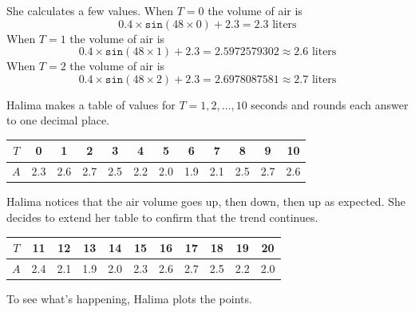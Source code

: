 She calculates a few values. When $T=0$ the volume of air is
$$0.4 \times \boxed{\texttt{sin}}(48 \times 0) + 2.3= 2.3 \text{ liters}$$
When $T=1$ the volume of air is
$$0.4 \times \boxed{\texttt{sin}}(48 \times 1) + 2.3= 2.5972579302 \approx 2.6 \text{ liters}$$
When $T=2$ the volume of air is
$$0.4 \times \boxed{\texttt{sin}}(48 \times 2) + 2.3= 2.6978087581 \approx 2.7 \text{ liters}$$

Halima makes a table of values for $T=1, 2, \ldots, 10$ seconds and rounds each answer to one decimal place.

\begin{center}
\begin{tabular}{c|c|c|c|c|c|c|c|c|c|c|c}
    $T$ & 0 & 1 & 2 & 3 & 4 & 5 & 6 & 7 & 8 & 9 & 10 \\ \hline
    $A$ & 2.3 & 2.6 & 2.7 & 2.5 & 2.2 & 2.0 & 1.9 & 2.1 & 2.5 & 2.7 & 2.6
\end{tabular}
\end{center}

Halima notices that the air volume goes up, then down, then up as expected.  She decides to extend her table to confirm that the trend continues.

\begin{center}
\begin{tabular}{c|c|c|c|c|c|c|c|c|c|c}
    $T$ & 11 & 12 & 13 & 14 & 15 & 16 & 17 & 18 & 19 & 20 \\ \hline
    $A$ & 2.4 & 2.1 & 1.9 & 2.0 & 2.3 & 2.6 & 2.7 & 2.5 & 2.2 & 2.0 
\end{tabular}
\end{center}

To see what's happening, Halima plots the points.

